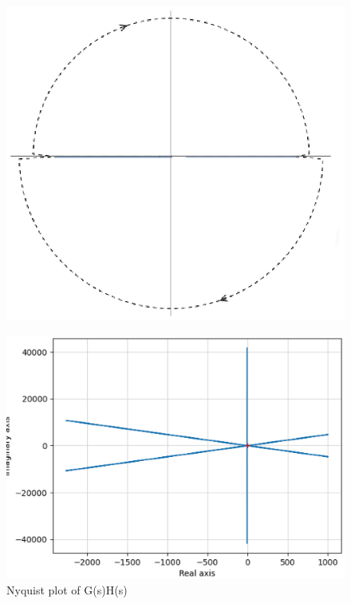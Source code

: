 \begin{figure}[ht!]
    \includegraphics[width=\columnwidth]{./figs/ee18btech11025/infi.eps}
    \caption{}
    \label{fig:splane}
\end{figure}


\begin{figure}[ht!]
    \includegraphics[width=\columnwidth]{./figs/ee18btech11025/g.eps}
    \caption{Nyquist plot of G(s)H(s)}
    \label{fig:nyqplot}
\end{figure}

